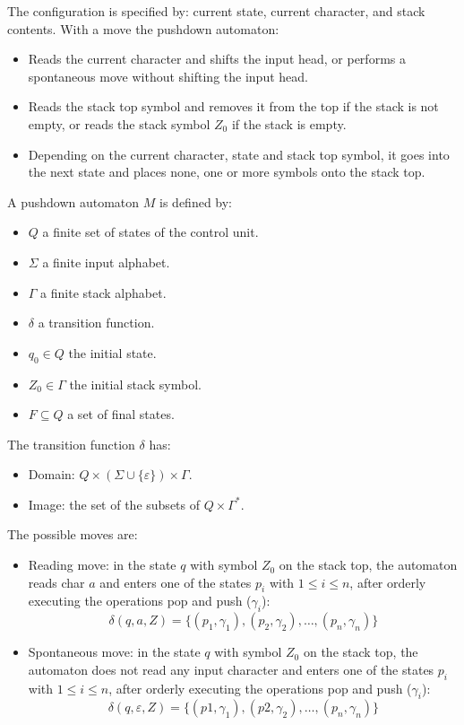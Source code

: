 The configuration is specified by: current state, current character, and stack contents. 
With a move the pushdown automaton: 
\begin{itemize}
    \item Reads the current character and shifts the input head, or performs a spontaneous move without shifting the input head. 
    \item Reads the stack top symbol and removes it from the top if the stack is not empty, or reads the stack symbol $Z_0$ if the stack is empty. 
    \item Depending on the current character, state and stack top symbol, it goes into the next state and places none, one or more symbols onto the stack top. 
\end{itemize}
\begin{definition}
    A pushdown automaton $M$ is defined by:
    \begin{itemize}
        \item $Q$ a finite set of states of the control unit.
        \item $\Sigma$ a finite input alphabet.
        \item $\Gamma$ a finite stack alphabet.
        \item $\delta$ a transition function.
        \item $q_0 \in Q$ the initial state.
        \item $Z_0 \in \Gamma$ the initial stack symbol.
        \item $F \subseteq Q$ a set of final states.
    \end{itemize}
\end{definition}
The transition function $\delta$ has:
\begin{itemize}
    \item Domain: $Q \times \left(\Sigma \cup \{\varepsilon\}\right) \times \Gamma$. 
    \item Image: the set of the subsets of $Q \times \Gamma^{*}$. 
\end{itemize}
The possible moves are: 
\begin{itemize}
    \item Reading move: in the state $q$ with symbol $Z_0$ on the stack top, the automaton reads char $a$ and enters one of the states $p_i$ with $1 \leq i \leq n$, after orderly executing the operations pop and push ($\gamma_i$): 
        \[\delta(q,a,Z)=\{(p_1,\gamma_1), (p_2,\gamma_2),\dots,(p_n,\gamma_n)\}\]
    \item Spontaneous move: in the state $q$ with symbol $Z_0$ on the stack top, the automaton does not read any input character and enters one of the states $p_i$ with $1 \leq i \leq n$, after orderly executing the operations pop and push ($\gamma_i$): 
        \[\delta(q,\varepsilon,Z)=\{(p1,\gamma_1), (p2,\gamma_2),\dots,(p_n,\gamma_n)\}\]
\end{itemize}
